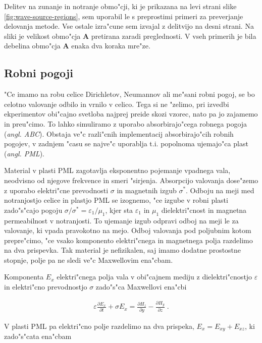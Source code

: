 \documentclass[a4paper,10pt]{article}
\newcommand{\odvod}[2]{\frac{\partial #1}{\partial #2}}
\newcommand{\eps}{\varepsilon}
\newcommand{\angl}[1]{(\textit{angl. #1})}
\begin{document}
Delitev na zunanje in notranje obmo"cji, ki je prikazana na levi strani slike \ref{fig:wave-source-regions}, sem uporabil le s preprostimi primeri za preverjanje delovanja metode. 
Vse ostale izra"cune sem izvajal z delitvijo na desni strani. 
Na sliki je velikost obmo"cja \textbf{A} pretirana zaradi preglednosti. 
V vseh primerih je bila debelina obmo"cja \textbf{A} enaka dva koraka mre"ze. 

\subsection{Robni pogoji}

"Ce imamo na robu celice Dirichletov, Neumannov ali me"sani robni pogoj, se bo celotno valovanje odbilo in vrnilo v celico. 
Tega si ne "zelimo, pri izvedbi ekperimentov obi"cajno svetloba najprej preide skozi vzorec, nato pa jo zajamemo in preu"cimo. 
To lahko simuliramo z uporabo absorbirajo"cega robnega pogoja \angl{\ac{ABC}}. 
Obstaja ve"c razli"cnih implementacij absorbirajo"cih robnih pogojev, v zadnjem "casu se najve"c uporablja t.i. popolnoma ujemajo"ca plast \angl{\ac{PML}}\cite{taflove,berenger}. 

Material v plasti \acs{PML} zagotavlja eksponentno pojemanje vpadnega vala, neodvisno od njegove frekvence in smeri "sirjenja. 
Absorpcijo valovanja dose"zemo z uporabo elektri"cne prevodnosti $\sigma$ in magnetnih izgub $\sigma^*$. 
Odboju na meji med notranjostjo celice in plastjo \acs{PML} se izognemo, "ce izgube v robni plasti zado"s"cajo pogoju $\sigma/\sigma^* = \eps_1/\mu_1$, kjer sta $\eps_1$ in $\mu_1$ dielektri"cnost in magnetna permeabilnost v notranjosti. 
To ujemanje izgub odpravi odboj na meji le za valovanje, ki vpada pravokotno na mejo. 
Odboj valovanja pod poljubnim kotom prepre"cimo, "ce vsako komponento elektri"cnega in magnetnega polja razdelimo na dva prispevka. 
Tak material je nefizikalen, saj imamo dodatne prostostne stopnje, polje pa ne sledi ve"c Maxwellovim ena"cbam. 

Komponenta $E_x$ elektri"cnega polja vala v obi"cajnem mediju z dielektri"cnostjo $\eps$ in elektri"cno prevodnostjo $\sigma$ zado"s"ca Maxwellovi ena"cbi

\begin{align}
 \eps \odvod{E_x}{t} + \sigma E_x = \odvod{H_z}{y} - \odvod{H_y}{z}\;.
\end{align}

V plasti \acs{PML} pa elektri"cno polje razdelimo na dva prispeka, $E_x = E_{xy} + E_{xz}$, ki zado"s"cata ena"cbam
\end{document}
